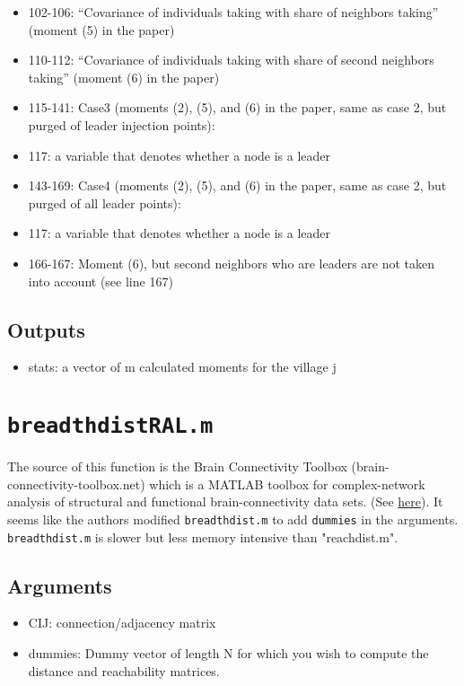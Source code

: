 \documentclass[10pt,letterpaper]{article}
\begin{document}
\begin{itemize}
\begin{itemize}
\begin{itemize}
\begin{itemize}
          \item 102-106: ``Covariance of individuals taking with share of neighbors taking'' (moment (5) in the paper)
          \item 110-112: ``Covariance of individuals taking with share of second neighbors taking'' (moment (6) in the paper)
      \item 115-141: Case3 (moments (2), (5), and (6) in the paper, same as case 2, but purged of leader injection points):
          \item 117: a variable that denotes whether a node is a leader
      \item 143-169: Case4 (moments (2), (5), and (6) in the paper, same as case 2, but purged of all leader points):
          \item 117: a variable that denotes whether a node is a leader
          \item 166-167: Moment (6), but second neighbors who are leaders are not taken into account (see line 167)
    \end{itemize}
\end{itemize}

\subsection*{Outputs}
\begin{itemize}
	\item stats: a vector of m calculated moments for the village j
\end{itemize}

\section{\texttt{breadthdistRAL.m}}\label{breadthdistRAL}

The source of this function is the Brain Connectivity Toolbox (brain-connectivity-toolbox.net) which is a MATLAB toolbox for complex-network analysis of structural and functional brain-connectivity data sets. (See \href{https://sites.google.com/site/bctnet/}{here}). It seems like the authors modified \texttt{breadthdist.m} to add \texttt{dummies} in the arguments. \texttt{breadthdist.m} is slower but less memory intensive than "reachdist.m".

\subsection*{Arguments}
\begin{itemize}
	\item CIJ: connection/adjacency matrix
	\item dummies: Dummy vector of length N for which you wish to compute the distance and reachability matrices.
\end{itemize}


\end{itemize}
\end{itemize}
\end{document}
